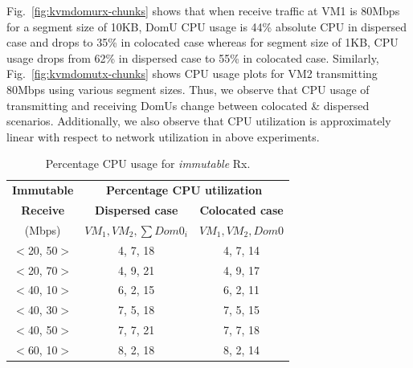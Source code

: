 Fig.~\ref{fig:kvmdomurx-chunks} shows that when receive traffic
at VM1 is 80Mbps for a segment size of 10KB, DomU CPU usage is
44\% absolute CPU in dispersed case and drops to 35\% in colocated case
whereas for segment size of 1KB, CPU usage drops from 62\% in
dispersed case to 55\% in colocated case. Similarly,
Fig.~\ref{fig:kvmdomutx-chunks}
shows CPU usage plots for VM2 transmitting 80Mbps using
various
segment sizes. Thus, we observe that CPU usage of transmitting
and receiving DomUs change between colocated \& dispersed scenarios.
Additionally, we also observe that CPU utilization
is approximately linear with respect to network utilization in
above experiments.


\begin{table}
\caption{Percentage CPU usage for \textit{immutable} Rx.}
\centering
\begin{tabular}{|c|c|c|} \hline
\textbf{Immutable} & \multicolumn{2}{|c|}{\textbf{Percentage CPU utilization}} \\ \cline{2-3} \cline{2-3}
\textbf{Receive} & \textbf{Dispersed case} & \textbf{Colocated case} \\
(Mbps) & $VM_1,VM_2, \sum Dom0_i$ & $VM_1,VM_2,Dom0$ \\ \hline
$<$20, 50$>$ & 4, 7, 18 & 4, 7, 14 \\ \hline
$<$20, 70$>$ & 4, 9, 21 & 4, 9, 17 \\ \hline
$<$40, 10$>$ & 6, 2, 15 & 6, 2, 11 \\ \hline
$<$40, 30$>$ & 7, 5, 18 & 7, 5, 15 \\ \hline
$<$40, 50$>$ & 7, 7, 21 & 7, 7, 18 \\ \hline
$<$60, 10$>$ & 8, 2, 18 & 8, 2, 14 \\ \hline
\end{tabular}
\label{nonaff-rx-benchmark}
\end{table}

